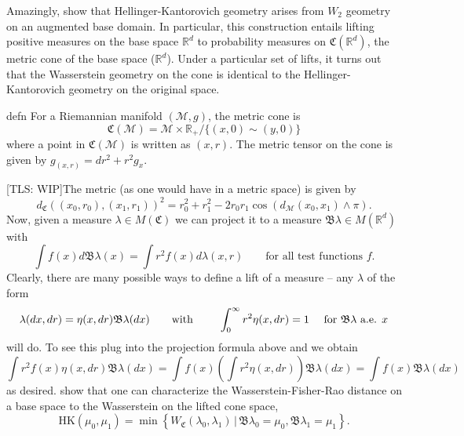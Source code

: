 \documentclass{article}
\newcommand{\man}{\mathcal{M}}
\newcommand{\tls}[1]{{\color{cyan}[TLS: #1]}}
\begin{document}
Amazingly, \citet{liero2016optimal} show that Hellinger-Kantorovich geometry arises from $W_2$ geometry on an augmented base domain. In particular, this construction entails lifting positive measures on the base space $\mathbb{R}^d$ to probability measures on $\mathfrak{C}(\mathbb{R}^d)$, the metric cone of the base space ($\mathbb{R}^d$). Under a particular set of lifts, it turns out that the Wasserstein geometry on the cone is identical to the Hellinger-Kantorovich geometry on the original space.

\begin{restatable}{defn}{}
    For a Riemannian manifold $(\man, g)$, the metric cone is
    \[\mathfrak{C}(\man) = \man \times \mathbb{R}_{+} / \{(x, 0) \sim (y, 0)\}\]
    where a point in $\mathfrak{C}(\man)$ is written as $(x, r)$. The metric tensor on the cone is given by $g_{(x,r)} = dr^2 + r^2g_x.$
\end{restatable} 
\tls{WIP}The metric (as one would have in a metric space) is given by
\begin{equation}
    d_{\mathfrak{C}}((x_0, r_0), (x_1, r_1))^2 = r_0^2 + r_1^2 - 2r_0r_1\cos(d_{\man}(x_0, x_1) \land \pi).
\end{equation}
Now, given a measure $\lambda \in M(\mathfrak{C})$ we can project it to a measure $\mathfrak{B}\lambda \in M(\mathbb{R}^d)$ with
\begin{equation}
    \int f(x)d\mathfrak{B}\lambda(x) = \int r^2 f(x) d\lambda(x, r) \qquad \text{for all test functions }f.
\end{equation}
Clearly, there are many possible ways to define a lift of a measure -- any $\lambda$ of the form
\begin{equation}
    \lambda(dx, dr) = \eta(x, dr)\mathfrak{B}\lambda(dx) \qquad \text{with } \qquad \int_0^\infty r^2\eta(x, dr) = 1 \text{ \quad for $\mathfrak{B}\lambda$ a.e. $x$}
\end{equation}
will do. To see this plug into the projection formula above and we obtain
\[\int r^2 f(x)\eta(x, dr)\mathfrak{B}\lambda(dx) = \int f(x) \left(\int r^2 \eta(x, dr) \right) \mathfrak{B}\lambda(dx) = \int f(x) \mathfrak{B}\lambda(dx) \]
as desired. \citet{liero2016optimal} show that one can characterize the Wasserstein-Fisher-Rao distance on a base space to the Wasserstein on the lifted cone space,
\begin{equation} \label{eq: cone wasserstein and hk equivalence}
    \text{HK}(\mu_0, \mu_1) = \min\left\{W_{\mathfrak{C}}(\lambda_0, \lambda_1) \,\Big|\, \mathfrak{B}\lambda_0 = \mu_0, \mathfrak{B}\lambda_1 = \mu_1\right\}.
\end{equation}
\end{document}
